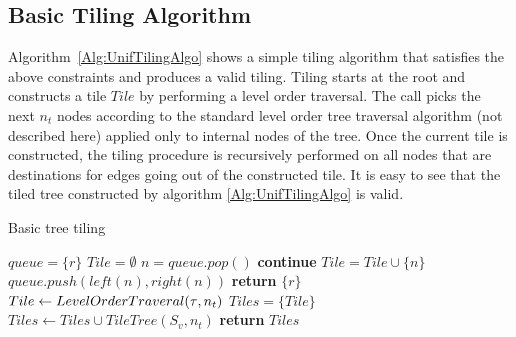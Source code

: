 \subsection{Basic Tiling Algorithm}
\label{sec:UnifTiling}
Algorithm~\ref{Alg:UnifTilingAlgo} shows a simple tiling algorithm that satisfies the above constraints and produces a valid tiling. 
Tiling starts at the root and constructs a tile $Tile$ by performing
a level order traversal. The call  picks the next $n_t$ nodes according to the standard 
level order tree traversal algorithm (not described here) applied only to internal nodes of the tree. Once the current tile is constructed, 
the tiling procedure is recursively performed on all nodes that are destinations for edges going out of the constructed tile.
It is easy to see that the tiled tree constructed by algorithm \ref{Alg:UnifTilingAlgo} is valid.
\begin{algorithm}
  \caption{Basic tree tiling}
  \label{Alg:UnifTilingAlgo}
  \begin{algorithmic}
        \State $queue = \{ r \}$
        \State $Tile = \emptyset$
          \State $n = queue.pop()$
              \State \textbf{continue}
          \EndIf
          \State $Tile = Tile \cup \{ n \}$
          \State $queue.push(left(n), right(n))$
        \EndWhile
      \EndProcedure
      \State {}
              \State \textbf{return} $\{ r \}$
          \EndIf
          \State $Tile \leftarrow LevelOrderTraveral(\operatorname{\tau}, n_t)$
          \State $Tiles =  \{ Tile \}$
              \State $Tiles \leftarrow Tiles \cup TileTree(S_v, n_t)$
          \EndFor
          \State \textbf{return} $Tiles$
      \EndProcedure
  \end{algorithmic}
\end{algorithm}

